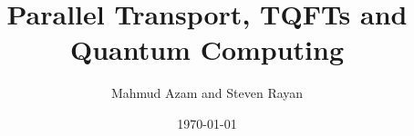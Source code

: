 
\title{Parallel Transport, TQFTs and Quantum Computing}
\author{Mahmud Azam and Steven Rayan}
\date{\today}
\maketitle

